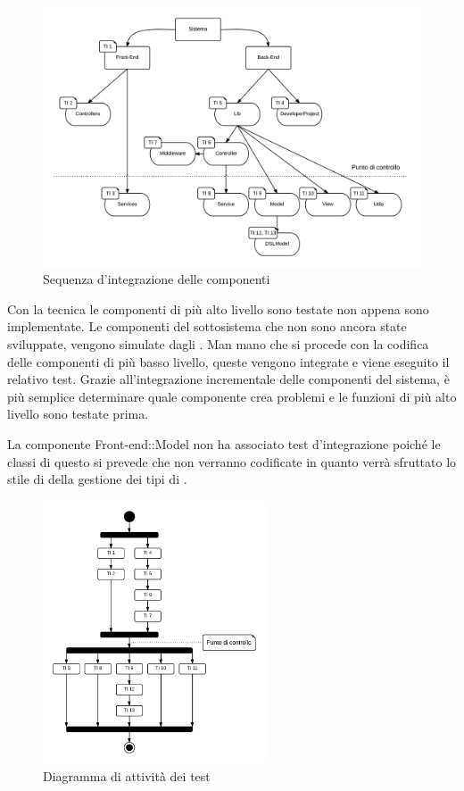 	\begin{figure}[H]
	\centering \includegraphics[width=1\textwidth]{sequenza-di-integrazione.png}
	\caption{Sequenza d'integrazione delle componenti}
	\label{fig:sequenza-di-integrazione}
	\end{figure}

	Con la tecnica  le componenti di più alto livello sono testate non appena sono implementate. Le componenti del sottosistema che non sono ancora state sviluppate, vengono simulate dagli . Man mano che si procede con la codifica delle componenti di più basso livello, queste vengono integrate e viene eseguito il relativo test. Grazie all'integrazione incrementale delle componenti del sistema, è più semplice determinare quale componente crea problemi e le funzioni di più alto livello sono testate prima.

	La componente Front-end::Model non ha associato test d'integrazione poiché le classi di questo  si prevede che non verranno codificate in quanto verrà sfruttato lo stile di  della gestione dei tipi di .

	\begin{figure}[H]
	\centering \includegraphics[width=0.59\textwidth]{sequenza-dei-test.png}
	\caption{Diagramma di attività dei test}
	\label{fig:sequenza-dei-test}
	\end{figure}
	
